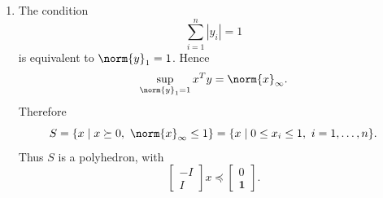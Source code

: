 \documentclass{ctexart}
\begin{document}
\begin{solution}
\begin{enumerate}
    \item
      The condition
      \[
        \sum_{i=1}^n |y_i|=1
      \]
      is equivalent to \(\norm{y}_1=1\). Hence
      \[
        \sup_{\norm{y}_1=1}x^Ty
        =
        \norm{x}_\infty.
      \]
      Therefore
      \[
        S
        =
        \{x\mid x\succeq0,\ \norm{x}_\infty\leq1\}
        =
        \{x\mid 0\leq x_i\leq1,\ i=1,\ldots,n\}.
      \]
      Thus \(S\) is a polyhedron, with
      \[
        \begin{bmatrix}
          -I\\
          I
        \end{bmatrix}x
        \preceq
        \begin{bmatrix}
          0\\
          \mathbf{1}
        \end{bmatrix}.
      \]
  \end{enumerate}
\end{solution}
\end{document}
